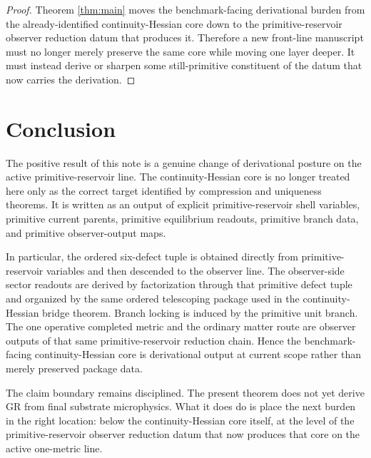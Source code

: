 \documentclass[11pt]{article}
\begin{document}
\begin{proof}
Theorem \ref{thm:main} moves the benchmark-facing derivational burden from the already-identified continuity-Hessian core down to the primitive-reservoir observer reduction datum that produces it. Therefore a new front-line manuscript must no longer merely preserve the same core while moving one layer deeper. It must instead derive or sharpen some still-primitive constituent of the datum that now carries the derivation.
\end{proof}

\section{Conclusion}

The positive result of this note is a genuine change of derivational posture on the active primitive-reservoir line. The continuity-Hessian core is no longer treated here only as the correct target identified by compression and uniqueness theorems. It is written as an output of explicit primitive-reservoir shell variables, primitive current parents, primitive equilibrium readouts, primitive branch data, and primitive observer-output maps.

In particular, the ordered six-defect tuple is obtained directly from primitive-reservoir variables and then descended to the observer line. The observer-side sector readouts are derived by factorization through that primitive defect tuple and organized by the same ordered telescoping package used in the continuity-Hessian bridge theorem. Branch locking is induced by the primitive unit branch. The one operative completed metric and the ordinary matter route are observer outputs of that same primitive-reservoir reduction chain. Hence the benchmark-facing continuity-Hessian core is derivational output at current scope rather than merely preserved package data.

The claim boundary remains disciplined. The present theorem does not yet derive GR from final substrate microphysics. What it does do is place the next burden in the right location: below the continuity-Hessian core itself, at the level of the primitive-reservoir observer reduction datum that now produces that core on the active one-metric line.
\end{document}
